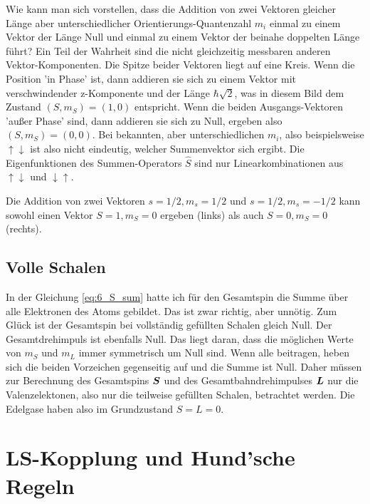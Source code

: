Wie kann man sich vorstellen, dass die Addition von zwei Vektoren gleicher Länge aber unterschiedlicher Orientierungs-Quantenzahl $m_i$ einmal zu einem Vektor der Länge Null und einmal zu einem Vektor der beinahe doppelten Länge führt? Ein Teil der Wahrheit sind die nicht gleichzeitig messbaren anderen Vektor-Komponenten. Die Spitze beider Vektoren liegt auf eine Kreis. Wenn die Position 'in Phase' ist, dann addieren sie sich zu einem Vektor mit verschwindender z-Komponente und der Länge $\hbar \sqrt{2}$, was in diesem Bild dem Zustand $(S, m_S) = (1,0)$ entspricht. Wenn die beiden Ausgangs-Vektoren 'außer Phase' sind, dann addieren sie sich zu Null, ergeben also  $(S, m_S) = (0,0)$. Bei bekannten, aber unterschiedlichen $m_i$, also beispielsweise $\uparrow \downarrow$ ist also nicht eindeutig, welcher Summenvektor sich ergibt. Die Eigenfunktionen des Summen-Operators $\hat{S}$ sind nur Linearkombinationen aus $\uparrow \downarrow$ und $\downarrow \uparrow$.

\begin{marginfigure}
\vspace*{2mm}

\caption{Die Addition von zwei Vektoren $s=1/2, m_s = 1/2$ und  $s=1/2, m_s = -1/2$ kann sowohl einen Vektor   $S=1, m_S = 0$ ergeben (links) als auch $S=0, m_S = 0$ (rechts).}
\end{marginfigure}

\subsection{Volle Schalen}

In der Gleichung \ref{eq:6_S_sum} hatte ich für den Gesamtspin die Summe über alle Elektronen des Atoms gebildet. Das ist zwar richtig, aber unnötig. Zum Glück ist der Gesamtspin bei vollständig gefüllten Schalen gleich Null. Der Gesamtdrehimpuls ist ebenfalls Null. Das liegt daran, dass die möglichen Werte von $m_S$ und $m_L$ immer symmetrisch um Null sind. Wenn alle beitragen, heben sich die beiden Vorzeichen gegenseitig auf und die Summe ist Null. Daher müssen zur Berechnung des Gesamtspins $\boldsymbol{S}$ und des Gesamtbahndrehimpulses $\boldsymbol{L}$ nur die Valenzelektonen, also nur die teilweise gefüllten Schalen, betrachtet werden. Die Edelgase haben also im Grundzustand $S=L=0$.


\section{LS-Kopplung und Hund'sche Regeln}

